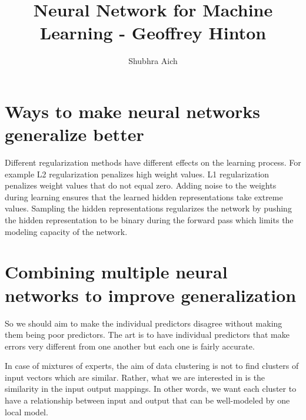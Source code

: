 \documentclass{article}
\title{Neural Network for Machine Learning - Geoffrey Hinton}
\date{}
\author{Shubhra Aich}
\begin{document}
\maketitle

\tableofcontents

\newpage


\section{Ways to make neural networks generalize better}
Different regularization methods have different effects on the learning process. For example L2 regularization penalizes high weight values. L1 regularization penalizes weight values that do not equal zero. Adding noise to the weights during learning ensures that the learned hidden representations take extreme values. Sampling the hidden representations regularizes the network by pushing the hidden representation to be binary during the forward pass which limits the modeling capacity of the network.

\section{Combining multiple neural networks to improve generalization}
So we should aim to make the individual predictors disagree without making them being
poor predictors. The art is to have individual predictors that make errors very different
from one another but each one is fairly accurate.

In case of mixtures of experts, the aim of data clustering is not to find clusters of input
vectors which are similar. Rather, what we are interested in is the similarity in the input
output mappings. In other words, we want each cluster to have a relationship between input and output that can be well-modeled by one local model.
\end{document}
